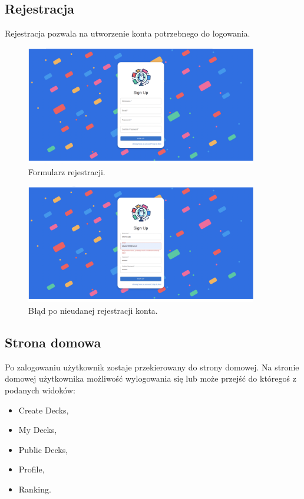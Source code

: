 \subsection{Rejestracja}
Rejestracja pozwala na utworzenie konta potrzebnego do logowania.


\begin{figure}[H]
    \centering
    \includegraphics[width=0.9\textwidth]{chapters/chapter_10/images_web/web_register}
    \caption{Formularz rejestracji.}
    \label{img:web_register}
\end{figure}


\begin{figure}[H]
    \centering
    \includegraphics[width=0.9\textwidth]{chapters/chapter_10/images_web/web_register_2}
    \caption{Błąd po nieudanej rejestracji konta.}
    \label{img:web_register_2}
\end{figure}


\subsection{Strona domowa}
Po zalogowaniu użytkownik zostaje przekierowany do strony domowej. Na stronie domowej użytkownika możliwość wylogowania się lub może przejść do któregoś z podanych widoków:
\begin{itemize}
    \item Create Decks,
    \item My Decks,
    \item Public Decks,
    \item Profile,
    \item Ranking.
\end{itemize}


